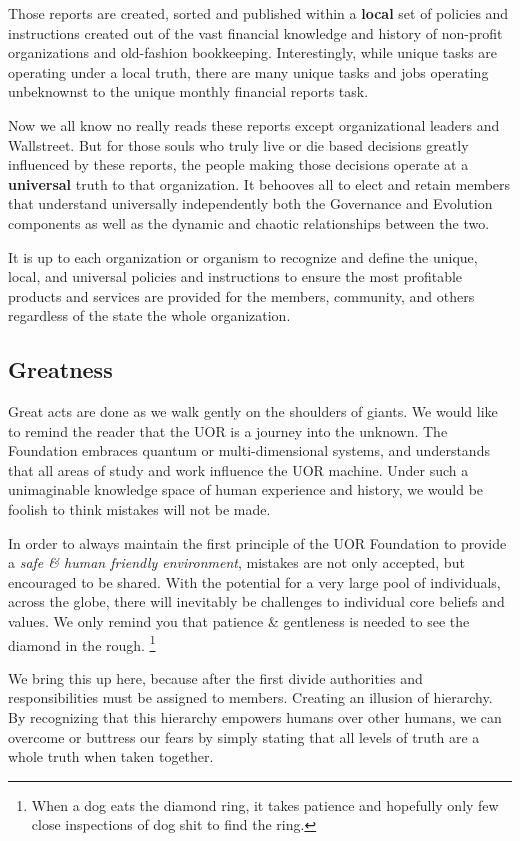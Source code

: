 \documentclass[twocolumn,10pt]{article}
\begin{document}
Those reports are created, sorted and published within a \textbf{local} set of policies and instructions created out of the vast financial knowledge and history of non-profit organizations and old-fashion bookkeeping.
Interestingly, while unique tasks are operating under a local truth, there are many unique tasks and jobs operating unbeknownst to the unique monthly financial reports task.

Now we all know no really reads these reports except organizational leaders and Wallstreet.
But for those souls who truly live or die based decisions greatly influenced by these reports, the people making those decisions operate at a \textbf{universal} truth to that organization.
It behooves all to elect and retain members that understand universally independently both the Governance and Evolution components as well as the dynamic and chaotic relationships between the two.

It is up to each organization or organism to recognize and define the unique, local, and universal policies and instructions to ensure the most profitable products and services are provided for the members, community, and others regardless of the state the whole organization.

\subsection*{Greatness}
Great acts are done as we walk gently on the shoulders of giants.
We would like to remind the reader that the UOR is a journey into the unknown.
The Foundation embraces quantum or multi-dimensional systems, and understands that all areas of study and work influence the UOR machine.
Under such a unimaginable knowledge space of human experience and history, we would be foolish to think mistakes will not be made.

In order to always maintain the first principle of the UOR Foundation to provide a \textit{safe \& human friendly environment}, mistakes are not only accepted, but encouraged to be shared.
With the potential for a very large pool of individuals, across the globe, there will inevitably be challenges to individual core beliefs and values.
We only remind you that patience \& gentleness is needed to see the diamond in the rough.
\footnote{When a dog eats the diamond ring, it takes patience and hopefully only few close inspections of dog shit to find the ring.}

We bring this up here, because after the first divide authorities and responsibilities must be assigned to members.
Creating an illusion of hierarchy.
By recognizing that this hierarchy empowers humans over other humans, we can overcome or buttress our fears by simply stating that all levels of truth are a whole truth when taken together.
\end{document}
